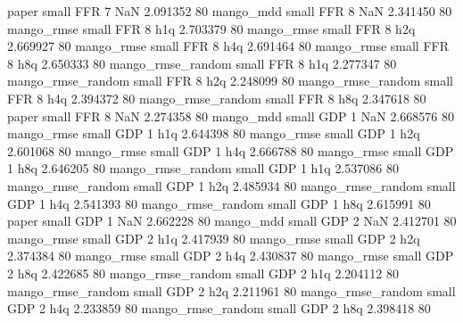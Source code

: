             paper      small      FFR                 7                  NaN 2.091352 80
        mango_mdd      small      FFR                 8                  NaN 2.341450 80
       mango_rmse      small      FFR                 8                  h1q 2.703379 80
       mango_rmse      small      FFR                 8                  h2q 2.669927 80
       mango_rmse      small      FFR                 8                  h4q 2.691464 80
       mango_rmse      small      FFR                 8                  h8q 2.650333 80
mango_rmse_random      small      FFR                 8                  h1q 2.277347 80
mango_rmse_random      small      FFR                 8                  h2q 2.248099 80
mango_rmse_random      small      FFR                 8                  h4q 2.394372 80
mango_rmse_random      small      FFR                 8                  h8q 2.347618 80
            paper      small      FFR                 8                  NaN 2.274358 80
        mango_mdd      small      GDP                 1                  NaN 2.668576 80
       mango_rmse      small      GDP                 1                  h1q 2.644398 80
       mango_rmse      small      GDP                 1                  h2q 2.601068 80
       mango_rmse      small      GDP                 1                  h4q 2.666788 80
       mango_rmse      small      GDP                 1                  h8q 2.646205 80
mango_rmse_random      small      GDP                 1                  h1q 2.537086 80
mango_rmse_random      small      GDP                 1                  h2q 2.485934 80
mango_rmse_random      small      GDP                 1                  h4q 2.541393 80
mango_rmse_random      small      GDP                 1                  h8q 2.615991 80
            paper      small      GDP                 1                  NaN 2.662228 80
        mango_mdd      small      GDP                 2                  NaN 2.412701 80
       mango_rmse      small      GDP                 2                  h1q 2.417939 80
       mango_rmse      small      GDP                 2                  h2q 2.374384 80
       mango_rmse      small      GDP                 2                  h4q 2.430837 80
       mango_rmse      small      GDP                 2                  h8q 2.422685 80
mango_rmse_random      small      GDP                 2                  h1q 2.204112 80
mango_rmse_random      small      GDP                 2                  h2q 2.211961 80
mango_rmse_random      small      GDP                 2                  h4q 2.233859 80
mango_rmse_random      small      GDP                 2                  h8q 2.398418 80
